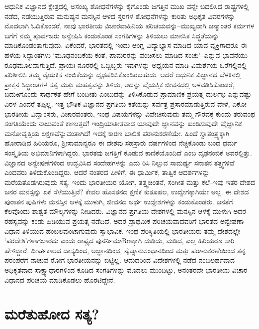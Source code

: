 ಆಧುನಿಕ ವಿಜ್ಞಾನದ ಕ್ಷೇತ್ರದಲ್ಲಿ ಅಸಂಖ್ಯ ಶೋಧನೆಗಳನ್ನು ಕೈಗೊಂಡು ಜಗತ್ತಿನ ಮುಖ ವನ್ನೇ ಬದಲಿಸಿದ ರಾಷ್ಟ್ರಗಳಲ್ಲಿ ನಡೆದ, ನಡೆಯುತ್ತಿರುವ ಮನುಷ್ಯನ ಮನಸ್ಸಿನ ಆಳದ ಸ್ತರಗಳ ಶೋಧನೆಗಳನ್ನು ಕುರಿತು ಅಧಿಕೃತ ವಿವರಗಳನ್ನು ಮೊದಲಾಗಿ ಓದಿಕೊಂಡರೆ, ನಾವು ಭಾರತೀಯ ವಿಚಾರವಾಹಿನಿಯ ಪರಿಚಯವನ್ನು–ಮುಖ್ಯವಾಗಿ ಜನ್ಮಾಂತರ ಕರ್ಮಗಳ ಬಗೆಗೆ ನಮ್ಮ ಪೂರ್ವಜರು ಅನ್ವೇಷಿಸಿ ಕಂಡುಕೊಂಡ ಸಂಗತಿಗಳನ್ನು ತಿಳಿಯಲು ಮಾನಸಿಕ ಸಿದ್ಧತೆಯನ್ನು ಮಾಡಿಕೊಂಡಂತಾಗುವುದು. ಏಕೆಂದರೆ, ಭಾರತದಲ್ಲಿ ಇಂದು ಆಂಗ್ಲ ವಿದ್ಯಾಭ್ಯಾಸ ಮಾಡಿದ ಯಾವ ವ್ಯಕ್ತಿಗಾದರೂ ಈ ಹಳೆಯ ಸಿದ್ಧಾಂತಗಳು ‘ಮೂಢನಂಬಿಕೆಯ ಕಂತೆ, ಪಾಮರರನ್ನು ವಂಚಿಸಲು ಮಾಡಿದ ಸಂಚು’–ಎನ್ನುವ ಭಾವನೆಯು ರೂಢಮೂಲವಾಗುತ್ತಿದೆ. ಪ್ರಾಯಃ ನೂರರಲ್ಲಿ ಒಬ್ಬಿಬ್ಬರು ಇವುಗಳನ್ನು ಅಧ್ಯಯನ ಮಾಡಿ ವಿಮರ್ಶೆಯ ಒರೆಗಲ್ಲಿನಲ್ಲಿ ಪರಿಶೀಲಿಸಿ ತಮ್ಮ ವೈಯಕ್ತಿಕ ನಂಬಿಕೆಯನ್ನು ದೃಢಪಡಿಸಿಕೊಂಡಿರಬಹುದು. ಆದರೆ ಆಧುನಿಕ ವಿಜ್ಞಾನದ ಬೆಳಕಿನಲ್ಲಿ ಪ್ರಾಕ್ತನ ಸಿದ್ಧಾಂತಗಳ ಸತ್ವ ಮತ್ತು ಮಹತ್ವವನ್ನು ತಿಳಿದು, ಅದನ್ನು ವೈಯಕ್ತಿಕ ಜೀವನದಲ್ಲಿ ಅಳವಡಿಸಿಕೊಂಡರೆ, ಬದುಕಿಗೊಂದು ಸಾರ್ಥಕತೆ ಹೇಗೆ ಬಂದೀತು ಎಂಬುದನ್ನು ತಿಳಿಸಿಕೊಡುವ ಪ್ರಾಮಾಣಿಕ ಪ್ರಯತ್ನ ದುರ್ಲಭ ಎನ್ನುವಷ್ಟು ವಿರಳ ಎಂದರೆ ತಪ್ಪಿಲ್ಲ. ಇತ್ತ ಭೌತಿಕ ವಿಜ್ಞಾನದ ಪ್ರಗತಿಯ ಕತೆಯನ್ನು ಸರ್ವತ್ರ ಪ್ರಸಾರಮಾಡುತ್ತಿರುವ ವೇಳೆ, ಏಕೋ ಭಾರತೀಯ ವಿದ್ವಾಂಸರು, ವಿಚಾರವಂತರು, ಇಂಥ ವಿಷಯಗಳನ್ನು ವಿವೇಚಿಸುವುದು ತಮ್ಮ ಗೌರವಕ್ಕೆ ಕುಂದು ತರುವಂಥ ಸಂಗತಿಯೆಂದು ನಾಚುವಂತೆ ಕಾಣುತ್ತದೆ! ಇಂದ್ರಿಯಾತೀತವಾದ ಯಾವುದೇ ಜ್ಞಾನವನ್ನು ಖಂಡಿಸುವುದೇ ವೈಜ್ಞಾನಿಕ ಮನೋವೃತ್ತಿಯ ಲಕ್ಷಣವೆನ್ನುವಂತಾಗಿದೆ! ಇದಕ್ಕೆ ಕಾರಣ ಬಾಲಿಶ ಪರಾನುಕರಣೆಯೇ. ಹಿಂದೆ ಸ್ವಾತಂತ್ರ್ಯಕ್ಕಾಗಿ ಹೋರಾಡಿದ ಹಿರಿಯರೂ, ಶ‍್ರೀಸಾಮಾನ್ಯರೂ ಈ ದೇಶವು ಸಹಸ್ರಾರು ವರ್ಷಗಳಿಂದ ನೆಚ್ಚಿಕೊಂಡು ಬಂದ ಧರ್ಮ ಸಂಸ್ಕೃತಿಯ ಅಭಿಮಾನಿಗಳಾಗಿದ್ದರು. ಭಾರತವು ಜಗತ್ತಿಗೆ ಕೊಡುವ ಕಾಣಿಕೆಯೊಂದಿದೆ ಎಂಬ ದೃಢನಂಬಿಕೆ ಅವರಲ್ಲಿತ್ತು. ವಿಜ್ಞಾನದ ಅನ್ವೇಷಣೆಗಳಿಂದ ಉದ್ಭವಿಸಿದ ಸಂದೇಹಗಳನ್ನು ಎದು ರಿಸಿ ನಿಲ್ಲುವ ಸಾಮರ್ಥ್ಯ ಸನಾತನ ತತ್ತ್ವಗಳಿವೆ ಎಂದವರು ತಿಳಿದುಕೊಂಡಿದ್ದರು. ಆದರೆ ನಂತರದ ಪೀಳಿಗೆ, ಈ ಧಾರ್ಮಿಕ, ತಾತ್ವಿಕ ಆದರ್ಶಗಳನ್ನು ಮರೆಯತೊಡಗಿರುವುದು ಸತ್ಯ. ಇಂದು ಭಾರತೀಯರ ಯೋಗ, ತತ್ತ್ವಚಿಂತನೆ, ಸಂಗೀತ ಮತ್ತು ಕಲೆ–ಇವು ಇತರ ದೇಶದ ಜನರ ಮನಸ್ಸನ್ನು ಏಕೆ ಸೆಳೆಯುತ್ತಿವೆ? ಕೇವಲ ಹೊಸತನದ ಕ್ಷಣಿಕ ಕುತೂಹಲ, ಉದ್ವೇಗಕ್ಕಾಗಿಯೇ ಅಲ್ಲ. ಈ ದೇಶದ ಪುರಾತನ ಪುಷಿಗಳು ಮನಸ್ಸಿನ ಆಳಕ್ಕೆ ಮುಳುಗಿ, ಜೀವನದ ಅರ್ಥ ಉದ್ದೇಶಗಳನ್ನು ಕಂಡುಕೊಂಡರು. ಜನತೆಗೆ ಕೆಲವೊಂದು ಶಾಶ್ವತ ಮೌಲ್ಯಗಳನ್ನು ನೀಡಿದರು. ವಿಜ್ಞಾನದ ಪ್ರಗತಿಯ ದೇಶಗಳಲ್ಲಿ ಮನಸ್ಸಿನ ಆಳಕ್ಕೆ ಮುಳುಗಿ ಅದರ ರಹಸ್ಯವನ್ನು ಕಂಡು ಹಿಡಿಯುವ ಪ್ರಯತ್ನ ನಡೆದಿದೆ. ಅದರ ಪ್ರಾಥಮಿಕ ಪರಿಚಯವಾದವರಿಗೆ ಭಾರತದ ಅನ್ವೇಷಣಾ ವಿಧಾನ ತಿಳಿಯುವ ಹಂಬಲವುಂಟಾಗುವುದು ಸ್ವಾಭಾವಿಕ. ಇಂಥ ಪರಿಸ್ಥಿತಿಯಲ್ಲಿ ಭಾರತೀಯರು ತಮ್ಮ ದೇಶದಲ್ಲೇ ‘ಪರದೇಶಿ’ಗಳಾಗಬಾರದು ಎಂದು ರಾಷ್ಟ್ರದ ಪುನರ್ನಿಮಾRಣಕ್ಕಾಗಿ ದುಡಿದು, ಮಡಿದ, ಎಲ್ಲ ಹಿರಿಯರೂ ಸಾರಿ ಹೇಳಿದ್ದಾರೆ. ದೀರ್ಘಕಾಲದ ದಾಸ್ಯದಿಂದ, ಅಜ್ಞಾನದಿಂದ, ನೈಚ್ಯಾನುಸಂಧಾನದಿಂದ ಮತ್ತು ಪರಾನುಕರಣೆಯಿಂದ ತನ್ನ ಪರಂಪರೆಗೆ ನಾಚುವ ರೋಗ ಭಾರತೀಯನನ್ನು ಬಿಟ್ಟಿಲ್ಲ. ಆದುದರಿಂದ ವಿದೇಶಗಳಲ್ಲಿ ನಡೆದ ನಂಬಲರ್ಹವಾದ ಅಧಿಕೃತವಾದ ಸಾಕ್ಷ್ಯಾಧಾರಗಳಿಂದ ಕೂಡಿದ ಸಂಗತಿಗಳನ್ನು ಮೊದಲು ಮುಂದಿಟ್ಟು, ಅನಂತರವೇ ಭಾರತೀಯ ವಿಚಾರ ವಿಧಾನದ ಪರಿಚಯ ಮಾಡಿಕೊಡಲು ಹೊರಟಿದ್ದೇನೆ.


\section{ಮರೆತುಹೋದ ಸತ್ಯ?}


